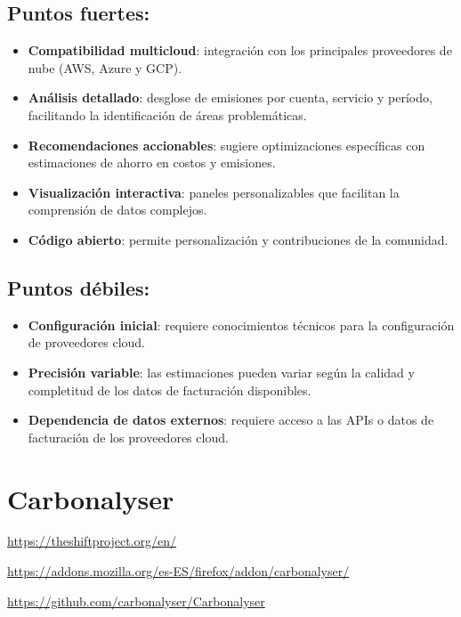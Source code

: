 \documentclass[12pt,a4paper]{report}
\begin{document}
\subsection*{Puntos fuertes:}

\begin{itemize}
  \item \textbf{Compatibilidad multicloud}: integración con los principales proveedores de nube (AWS, Azure y GCP).
  \item \textbf{Análisis detallado}: desglose de emisiones por cuenta, servicio y período, facilitando la identificación de áreas problemáticas.
  \item \textbf{Recomendaciones accionables}: sugiere optimizaciones específicas con estimaciones de ahorro en costos y emisiones.
  \item \textbf{Visualización interactiva}: paneles personalizables que facilitan la comprensión de datos complejos.
  \item \textbf{Código abierto}: permite personalización y contribuciones de la comunidad.
\end{itemize}

\subsection*{Puntos débiles:}

\begin{itemize}
  \item \textbf{Configuración inicial}: requiere conocimientos técnicos para la configuración de proveedores cloud.
  \item \textbf{Precisión variable}: las estimaciones pueden variar según la calidad y completitud de los datos de facturación disponibles.
  \item \textbf{Dependencia de datos externos}: requiere acceso a las APIs o datos de facturación de los proveedores cloud.
\end{itemize}

\section*{Carbonalyser}

\href{https://theshiftproject.org/en/}{https://theshiftproject.org/en/}

\href{https://addons.mozilla.org/es-ES/firefox/addon/carbonalyser/}{https://addons.mozilla.org/es-ES/firefox/addon/carbonalyser/}

\href{https://github.com/carbonalyser/Carbonalyser}{https://github.com/carbonalyser/Carbonalyser}
\end{document}
